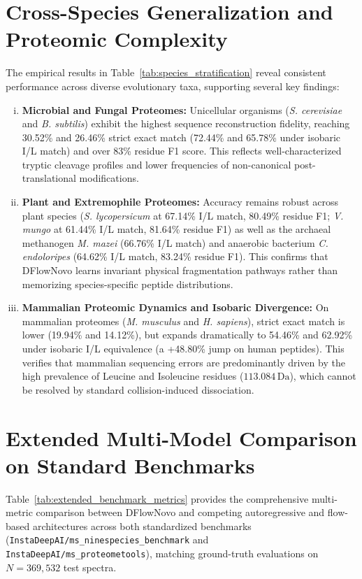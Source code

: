\section{Cross-Species Generalization and Proteomic Complexity}

The empirical results in Table~\ref{tab:species_stratification} reveal consistent performance across diverse evolutionary taxa, supporting several key findings:
\begin{enumerate}[(i)]
\item \textbf{Microbial and Fungal Proteomes:} Unicellular organisms (\emph{S. cerevisiae} and \emph{B. subtilis}) exhibit the highest sequence reconstruction fidelity, reaching 30.52\% and 26.46\% strict exact match (72.44\% and 65.78\% under isobaric I/L match) and over 83\% residue F1 score. This reflects well-characterized tryptic cleavage profiles and lower frequencies of non-canonical post-translational modifications.
\item \textbf{Plant and Extremophile Proteomes:} Accuracy remains robust across plant species (\emph{S. lycopersicum} at 67.14\% I/L match, 80.49\% residue F1; \emph{V. mungo} at 61.44\% I/L match, 81.64\% residue F1) as well as the archaeal methanogen \emph{M. mazei} (66.76\% I/L match) and anaerobic bacterium \emph{C. endoloripes} (64.62\% I/L match, 83.24\% residue F1). This confirms that DFlowNovo learns invariant physical fragmentation pathways rather than memorizing species-specific peptide distributions.
\item \textbf{Mammalian Proteomic Dynamics and Isobaric Divergence:} On mammalian proteomes (\emph{M. musculus} and \emph{H. sapiens}), strict exact match is lower (19.94\% and 14.12\%), but expands dramatically to 54.46\% and 62.92\% under isobaric I/L equivalence (a +48.80\% jump on human peptides). This verifies that mammalian sequencing errors are predominantly driven by the high prevalence of Leucine and Isoleucine residues ($113.084\,\text{Da}$), which cannot be resolved by standard collision-induced dissociation.
\end{enumerate}

\section{Extended Multi-Model Comparison on Standard Benchmarks}

Table~\ref{tab:extended_benchmark_metrics} provides the comprehensive multi-metric comparison between DFlowNovo and competing autoregressive and flow-based architectures across both standardized benchmarks (\texttt{InstaDeepAI/ms\_ninespecies\_benchmark} and \texttt{InstaDeepAI/ms\_proteometools}), matching ground-truth evaluations on $N = 369,532$ test spectra.

